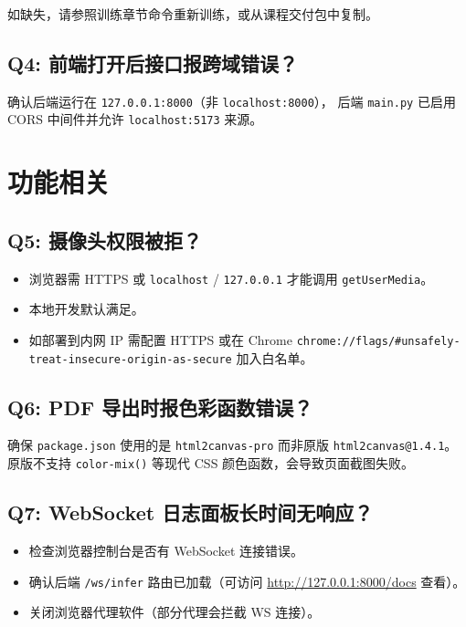\documentclass[12pt, a4paper, openany]{ctexbook}
\begin{document}
如缺失，请参照训练章节命令重新训练，或从课程交付包中复制。

\subsection*{Q4: 前端打开后接口报跨域错误？}

确认后端运行在 \texttt{127.0.0.1:8000}（非 \texttt{localhost:8000}），
后端 \texttt{main.py} 已启用 CORS 中间件并允许 \texttt{localhost:5173} 来源。

\section{功能相关}

\subsection*{Q5: 摄像头权限被拒？}

\begin{itemize}
  \item 浏览器需 HTTPS 或 \texttt{localhost} / \texttt{127.0.0.1} 才能调用 \texttt{getUserMedia}。
  \item 本地开发默认满足。
  \item 如部署到内网 IP 需配置 HTTPS 或在 Chrome \texttt{chrome://flags/\#unsafely-treat-insecure-origin-as-secure} 加入白名单。
\end{itemize}

\subsection*{Q6: PDF 导出时报色彩函数错误？}

确保 \texttt{package.json} 使用的是 \texttt{html2canvas-pro} 而非原版 \texttt{html2canvas@1.4.1}。
原版不支持 \texttt{color-mix()} 等现代 CSS 颜色函数，会导致页面截图失败。

\subsection*{Q7: WebSocket 日志面板长时间无响应？}

\begin{itemize}
  \item 检查浏览器控制台是否有 WebSocket 连接错误。
  \item 确认后端 \texttt{/ws/infer} 路由已加载（可访问 \url{http://127.0.0.1:8000/docs} 查看）。
  \item 关闭浏览器代理软件（部分代理会拦截 WS 连接）。
\end{itemize}
\end{document}
